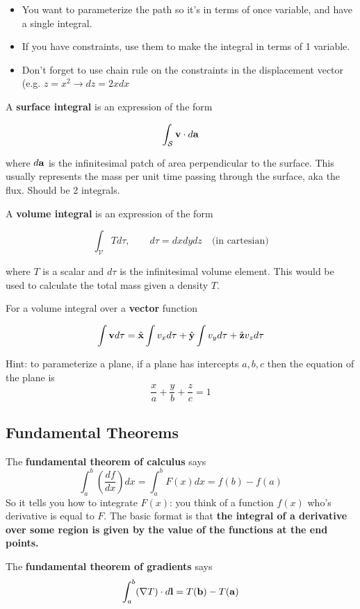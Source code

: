 \documentclass{article}
\newcommand{\vh}[1]{\hat{\vb{#1}}}
\begin{document}
\begin{itemize}
    \item You want to parameterize the path so it's in terms of once variable, and have a single integral.
    \item If you have constraints, use them to make the integral in terms of 1 variable.
    \item Don't forget to use chain rule on the constraints in the displacement vector (e.g. $z=x^2 \to dz = 2x dx$
\end{itemize}

A \textbf{surface integral} is an expression of the form

$$
\int_{\mathcal{S}} \vb{v} \cdot d\vb{a}
$$

where $d\vb{a}$ is the infinitesimal patch of area perpendicular to the surface.  This usually represents the mass per unit time passing through the surface, aka the flux.  Should be 2 integrals.

A \textbf{volume integral} is an expression of the form

$$
\int_{\mathcal{V}} T d\tau, \qquad d\tau = dxdydz \quad \text{(in cartesian)}
$$

where $T$ is a scalar and $d\tau$ is the infinitesimal volume element.  This would be used to calculate the total mass given a density $T$.

For a volume integral over a \textbf{vector} function

$$
\int \vb{v} d\tau = \vh{x} \int v_x d\tau + \vh{y} \int v_y d\tau + \vh{z} v_z d\tau
$$

Hint: to parameterize a plane, if a plane has intercepts $a, b, c$ then the equation of the plane is
$$
\frac{x}{a} + \frac{y}{b} + \frac{z}{c} = 1
$$

\subsection{Fundamental Theorems}

The \textbf{fundamental theorem of calculus} says
$$
\int_a^b \left( \frac{df}{dx} \right) dx = \int_a^b F(x) dx = f(b) - f(a)
$$
So it tells you how to integrate $F(x)$: you think of a function $f(x)$ who's derivative is equal to $F$.  The basic format is that \textbf{the integral of a derivative over some region is given by the value of the functions at the end points.}

The \textbf{fundamental theorem of gradients} says 
$$
\int_a^b (\nabla T) \cdot d\vb{l} = T(\vb{b}) - T(\vb{a})
$$
\end{document}
